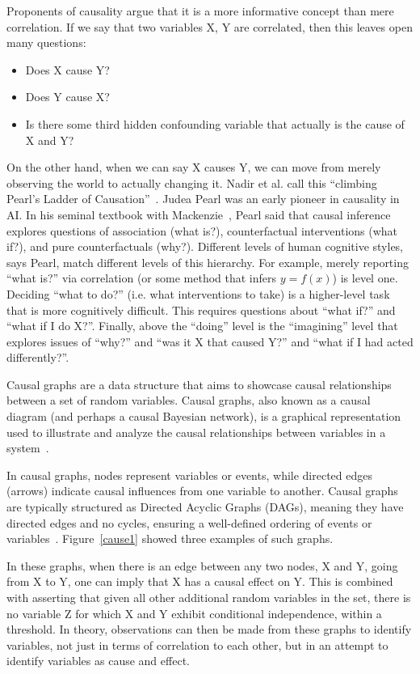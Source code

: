 \documentclass[]{svjour3}
\begin{document}
 Proponents of causality argue that it is a more informative concept than mere correlation. If we say that two variables X, Y are correlated, then this leaves open  many questions:  
 \begin{itemize}
     \item Does X cause Y?
     \item Does Y cause X?
     \item Is there some third hidden confounding variable that actually 
     is the cause of X and Y?
 \end{itemize}
 On the other hand, when we can say X causes Y, we can move from merely observing the world to actually changing it. Nadir et al. call this ``climbing Pearl's Ladder of Causation''~\cite{Poshyvanyk24}.  Judea Pearl was an early pioneer in causality in AI.  In his seminal textbook with  Mackenzie~\cite{pearl2018book},  Pearl said that causal inference explores   questions of association (what is?),
counterfactual interventions (what if?), and pure counterfactuals (why?). Different levels of human cognitive styles, says Pearl, match different levels of this hierarchy. For example, merely reporting ``what is?'' via correlation
(or some method that infers $y=f(x)$) is level one.
Deciding ``what to do?''  (i.e. what interventions to take) is a higher-level task that is more cognitively difficult. This requires questions about ``what if?'' and ``what if I do X?''.  
Finally, above  the ``doing'' level is the ``imagining'' level that explores
issues of ``why?'' and ``was it X that caused Y?'' and ``what if I had acted differently?''. 

Causal graphs are a data structure that aims to showcase causal relationships between a set of random variables.
Causal graphs, also known as a causal diagram (and perhaps a causal Bayesian network), is a graphical representation used to illustrate and analyze the causal relationships between variables in a system~\cite{Pearl1995}. 

In causal graphs, nodes represent variables or events, while directed edges (arrows) indicate causal influences from one variable to another. 
Causal graphs are typically structured as Directed Acyclic Graphs (DAGs), meaning they have directed edges and no cycles, ensuring a well-defined ordering of events or variables~\cite{williams2018directed}.
Figure~\ref{cause1} showed three examples of such graphs.

 
 In these graphs, when there is an edge between any two nodes, X and Y, going from X to Y, one can imply that X has a causal effect on Y.  This is combined with asserting that given all other additional random variables in the set, there is no variable Z for which X and Y exhibit conditional independence\cite{CAUSALLDEF}\cite{PCParalell}, within a threshold.  In theory, observations can then be made from these graphs to identify variables, not just in terms of correlation to each other, but in an attempt to identify variables as cause and effect. 
\end{document}
